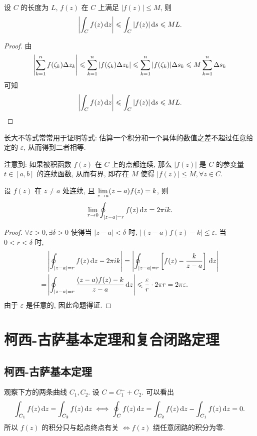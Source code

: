 \begin{theorem}[长大不等式]
	设 $C$ 的长度为 $L$, $f(z)$ 在 $C$ 上满足 $|f(z)|\le M$, 则
		\[\left|\int_Cf(z)\,\mathrm{d} z\right|\leqslant\int_C|f(z)|\,\mathrm{d} s\leqslant ML.\]
\end{theorem}

\begin{proof}
	由
		\[\left|\sum_{k=1}^n f(\zeta_k)\Delta z_k\right|
		\leqslant\sum_{k=1}^n|f(\zeta_k)\Delta z_k|
		\leqslant\sum_{k=1}^n|f(\zeta_k)|\Delta s_k
		\leqslant M\sum_{k=1}^n\Delta s_k\]
	可知
		\[\left|\int_Cf(z)\,\mathrm{d} z\right|\leqslant\int_C|f(z)|\,\mathrm{d} s\leqslant ML.\qedhere\]
\end{proof}

长大不等式常常用于证明等式: 估算一个积分和一个具体的数值之差不超过任意给定的 $\varepsilon$, 从而得到二者相等.

注意到: 如果被积函数 $f(z)$ 在 $C$ 上的点都连续, 那么 $|f(z)|$ 是 $C$ 的参变量 $t\in[a,b]$ 的连续函数, 从而有界, 即存在 $M$ 使得 $|f(z)|\le M,\forall z\in C$.

\begin{example}
	设 $f(z)$ 在 $z\neq a$ 处连续, 且 $\lim\limits_{z\rightarrow a}(z-a)f(z)=k$, 则
	\[\lim_{r\rightarrow0}\oint_{|z-a|=r}f(z)\,\mathrm{d} z=2\pi ik.\]
\end{example}

\begin{proof}
	$\forall \varepsilon>0,\exists\delta>0$ 使得当 $|z-a|<\delta$ 时, $|(z-a)f(z)-k|\le\varepsilon$.
	当 $0<r<\delta$ 时,
	\begin{align*}
		 &\left|\oint_{|z-a|=r}f(z)\,\mathrm{d} z-2\pi i k\right|
		=\left|\oint_{|z-a|=r}\left[f(z)-\frac k{z-a}\right]\,\mathrm{d} z\right|\\
		=&\left|\oint_{|z-a|=r}\frac{(z-a)f(z)-k}{z-a}\,\mathrm{d} z\right|
		\leqslant \frac{\varepsilon}r\cdot 2\pi r=2\pi\varepsilon.
	\end{align*}
	由于 $\varepsilon$ 是任意的, 因此命题得证.
\end{proof}



\section{柯西-古萨基本定理和复合闭路定理}

\subsection{柯西-古萨基本定理}

观察下方的两条曲线 $C_1,C_2$.
设 $C=C_1^-+C_2$.
可以看出
\[\int_{C_1}f(z)\,\mathrm{d} z=\int_{C_2}f(z)\,\mathrm{d} z\iff
\oint_Cf(z)\,\mathrm{d} z=\int_{C_2}f(z)\,\mathrm{d} z-\int_{C_1}f(z)\,\mathrm{d} z=0.\]
所以 $f(z)$ 的积分只与起点终点有关 $\iff f(z)$ 绕任意闭路的积分为零.


